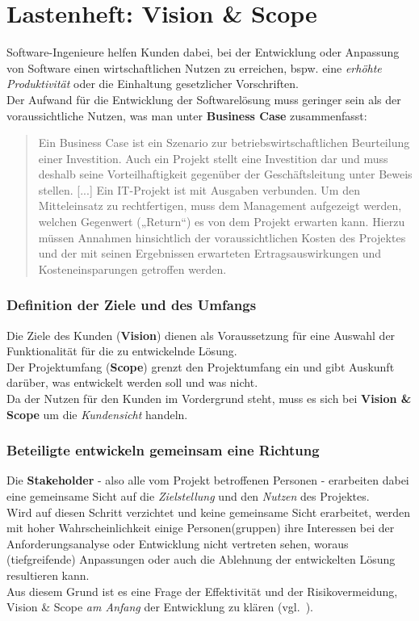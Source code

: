 \section{Lastenheft: Vision \& Scope}\label{sec:lastenheft-vision-scope}

Software-Ingenieure helfen Kunden dabei, bei der Entwicklung oder Anpassung von Software einen wirtschaftlichen Nutzen zu erreichen, bspw. eine \textit{erhöhte Produktivität} oder die Einhaltung gesetzlicher Vorschriften.\\
Der Aufwand für die Entwicklung der Softwarelösung muss geringer sein als der voraussichtliche Nutzen, was man unter \textbf{Business Case} zusammenfasst:

\blockquote[{\cite[11]{Brug09}}]{
    Ein Business Case ist ein Szenario zur betriebswirtschaftlichen Beurteilung einer Investition.
    Auch ein Projekt stellt eine Investition dar und
    muss deshalb seine Vorteilhaftigkeit gegenüber der Geschäftsleitung unter
    Beweis stellen. [...] Ein IT-Projekt ist mit Ausgaben verbunden. Um den Mitteleinsatz zu rechtfertigen, muss dem Management
    aufgezeigt werden, welchen Gegenwert („Return“) es von dem Projekt erwarten kann. Hierzu müssen Annahmen hinsichtlich der voraussichtlichen
    Kosten des Projektes und der mit seinen Ergebnissen erwarteten Ertragsauswirkungen und Kosteneinsparungen getroffen werden.
}

\subsubsection*{Definition der Ziele und des Umfangs}
Die Ziele des Kunden (\textbf{Vision}) dienen als Voraussetzung für eine Auswahl der Funktionalität für die zu entwickelnde Lösung.\\
Der Projektumfang (\textbf{Scope}) grenzt den Projektumfang ein und gibt Auskunft darüber, was entwickelt werden soll und was nicht.\\
Da der Nutzen für den Kunden im Vordergrund steht, muss es sich bei \textbf{Vision \& Scope} um die \textit{Kundensicht} handeln.\\

\subsubsection*{Beteiligte entwickeln gemeinsam eine Richtung}
Die \textbf{Stakeholder} - also alle vom Projekt betroffenen Personen - erarbeiten dabei eine gemeinsame Sicht auf die \textit{Zielstellung} und den \textit{Nutzen} des Projektes.\\
Wird auf diesen Schritt verzichtet und keine gemeinsame Sicht erarbeitet, werden mit hoher Wahrscheinlichkeit einige Personen(gruppen) ihre Interessen bei der Anforderungsanalyse oder  Entwicklung nicht vertreten sehen, woraus (tiefgreifende) Anpassungen oder auch die Ablehnung der entwickelten Lösung resultieren kann.\\
Aus diesem Grund ist es eine Frage der Effektivität und der Risikovermeidung, Vision \& Scope \textit{am Anfang} der Entwicklung zu klären (vgl.~\cite[44]{Wed09}).

